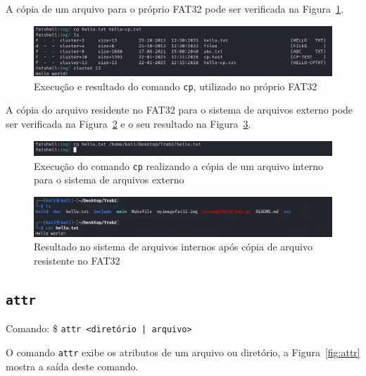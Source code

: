\documentclass[
    12pt,				%
    oneside,   	        %
    a4paper,			%
    english,			%
    french,				%
    spanish,			%
    brazil,				%
    ]{pacotes/abntex2}
\begin{document}
A cópia de um arquivo para o próprio FAT32 pode ser verificada na Figura~\ref{fig:cp-interno-attr}.

\begin{figure}[H]
    \centering
    \includegraphics[width=450pt]{figuras/resultados/5-cp-interno-attr.PNG}
    \caption{Execução e resultado do comando \texttt{cp}, utilizado no próprio FAT32}
    \label{fig:cp-interno-attr}
\end{figure}

A cópia do arquivo residente no FAT32 para o sistema de arquivos externo pode ser verificada na Figura~\ref{fig:cp-interno-externo-1} e o seu resultado na Figura~\ref{fig:cp-interno-externo-2}.

\begin{figure}[H]
    \centering
    \includegraphics[width=450pt]{figuras/resultados/6-cp-interno-externo.PNG}
    \caption{Execução do comando \texttt{cp} realizando a cópia de um arquivo interno para o sistema de arquivos externo}
    \label{fig:cp-interno-externo-1}
\end{figure}

\begin{figure}[H]
    \centering
    \includegraphics[width=450pt]{figuras/resultados/7-cp-arquivo-externo-resultado.PNG}
    \caption{Resultado no sistema de arquivos internos após cópia de arquivo resistente no FAT32}
    \label{fig:cp-interno-externo-2}
\end{figure}


\subsection{\texttt{attr}}
\label{subsec:attr}
Comando: \$ \texttt{attr <diretório | arquivo> }

O comando \texttt{attr} exibe os atributos de um arquivo ou diretório, a Figura~\ref{fig:attr} mostra a saída deste comando.
\end{document}
